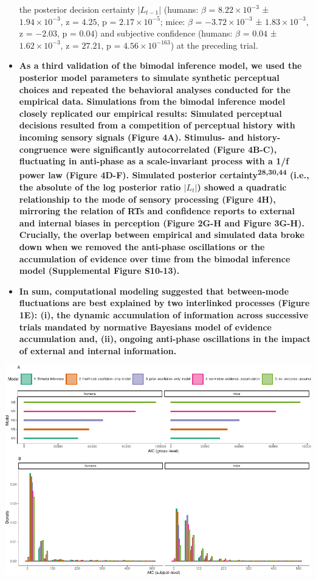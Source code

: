 \documentclass[
]{article}
\begin{document}
\begin{itemize}
{  the posterior decision certainty \(|L_{t-1}|\) (humans: \(\beta\) =
  \(\ensuremath{8.22\times 10^{-3}}\) ±
  \(\ensuremath{1.94\times 10^{-3}}\), z = \(4.25\), p =
  \(\ensuremath{2.17\times 10^{-5}}\); mice: \(\beta\) =
  \(\ensuremath{-3.72\times 10^{-3}}\) ±
  \(\ensuremath{1.83\times 10^{-3}}\), z = \(-2.03\), p = \(0.04\)) and
  subjective confidence (humans: \(\beta\) = \(0.04\) ±
  \(\ensuremath{1.62\times 10^{-3}}\), z = \(27.21\), p =
  \(\ensuremath{4.56\times 10^{-163}}\)) at the preceding trial.}
\item
  \textbf{As a third validation of the bimodal inference model, we used
  the posterior model parameters to simulate synthetic perceptual
  choices and repeated the behavioral analyses conducted for the
  empirical data. Simulations from the bimodal inference model closely
  replicated our empirical results: Simulated perceptual decisions
  resulted from a competition of perceptual history with incoming
  sensory signals (Figure 4A). Stimulus- and history-congruence were
  significantly autocorrelated (Figure 4B-C), fluctuating in anti-phase
  as a scale-invariant process with a 1/f power law (Figure 4D-F).
  Simulated posterior certainty\textsuperscript{28,30,44} (i.e., the
  absolute of the log posterior ratio \(|L_t|\)) showed a quadratic
  relationship to the mode of sensory processing (Figure 4H), mirroring
  the relation of RTs and confidence reports to external and internal
  biases in perception (Figure 2G-H and Figure 3G-H). Crucially, the
  overlap between empirical and simulated data broke down when we
  removed the anti-phase oscillations or the accumulation of evidence
  over time from the bimodal inference model (Supplemental Figure
  S10-13).}
\item
  \textbf{In sum, computational modeling suggested that between-mode
  fluctuations are best explained by two interlinked processes (Figure
  1E): (i), the dynamic accumulation of information across successive
  trials mandated by normative Bayesians model of evidence accumulation
  and, (ii), ongoing anti-phase oscillations in the impact of external
  and internal information.}
\end{itemize}

\includegraphics{modes_mouse_rev1b_files/figure-latex/Supplemental_Figure_S9_print-1.pdf}
\end{document}
